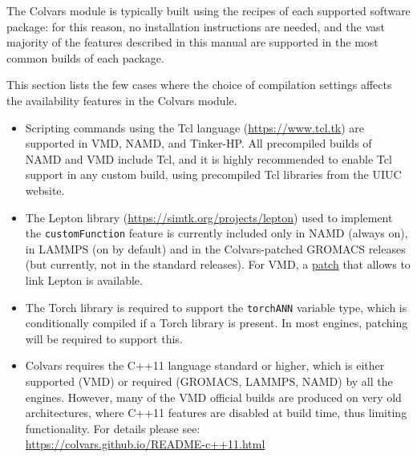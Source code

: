 
The Colvars module is typically built using the recipes of each supported software package: for this reason, no installation instructions are needed, and the vast majority of the features described in this manual are supported in the most common builds of each package.

This section lists the few cases where the choice of compilation settings affects the availability features in the Colvars module.

\begin{itemize}

\item Scripting commands using the Tcl language (\url{https://www.tcl.tk}) are supported in VMD, NAMD, and Tinker-HP.  All precompiled builds of NAMD and VMD include Tcl, and it is highly recommended to enable Tcl support in any custom build, using precompiled Tcl libraries from the UIUC website.

\item The Lepton library (\url{https://simtk.org/projects/lepton}) used to implement the \texttt{customFunction} feature is currently included only in NAMD (always on), in LAMMPS (on by default) and in the Colvars-patched GROMACS releases (but currently, not in the standard releases).  For VMD, a \href{https://github.com/giacomofiorin/vmd-patches}{patch} that allows to link Lepton is available.

\item The Torch library is required to support the \texttt{torchANN} variable type, which is conditionally compiled if a Torch library is present.  In most engines, patching will be required to support this.

\item Colvars requires the C++11 language standard or higher, which is either supported (VMD) or required (GROMACS, LAMMPS, NAMD) by all the engines.  However, many of the VMD official builds are produced on very old architectures, where C++11 features are disabled at build time, thus limiting functionality.  For details please see:\\
  \url{https://colvars.github.io/README-c++11.html}
\end{itemize}

